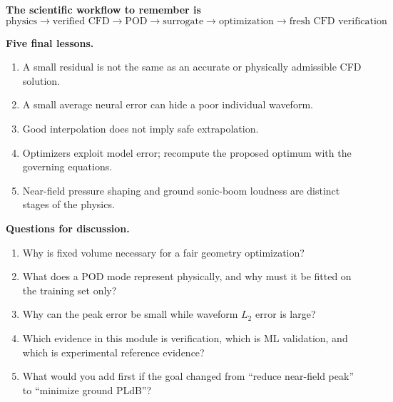 \textbf{The scientific workflow to remember is}
\begin{equation}
 \boxed{
 \text{physics}\rightarrow\text{verified CFD}\rightarrow\text{POD}\rightarrow
 \text{surrogate}\rightarrow\text{optimization}\rightarrow\text{fresh CFD verification}
 }.
\end{equation}

\textbf{Five final lessons.}
\begin{enumerate}
\item A small residual is not the same as an accurate or physically admissible CFD solution.
\item A small average neural error can hide a poor individual waveform.
\item Good interpolation does not imply safe extrapolation.
\item Optimizers exploit model error; recompute the proposed optimum with the governing equations.
\item Near-field pressure shaping and ground sonic-boom loudness are distinct stages of the physics.
\end{enumerate}

\textbf{Questions for discussion.}
\begin{enumerate}
\item Why is fixed volume necessary for a fair geometry optimization?
\item What does a POD mode represent physically, and why must it be fitted on the training set only?
\item Why can the peak error be small while waveform $L_2$ error is large?
\item Which evidence in this module is verification, which is ML validation, and which is experimental reference evidence?
\item What would you add first if the goal changed from ``reduce near-field peak'' to ``minimize ground PLdB''?
\end{enumerate}

